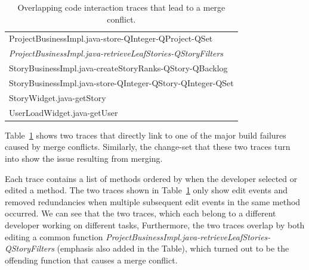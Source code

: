 \begin{table}[t!]
\begin{tabular}{l}
     ProjectBusinessImpl.java-store-QInteger-QProject-QSet        \\%
     \emph{ProjectBusinessImpl.java-retrieveLeafStories-QStoryFilters}                                 \\%
     StoryBusinessImpl.java-createStoryRanks-QStory-QBacklog                     \\%
     StoryBusinessImpl.java-store-QInteger-QStory-QInteger-QSet  \\%
     StoryWidget.java-getStory                                                       \\%
     UserLoadWidget.java-getUser                                                     \\%
      \bottomrule
\end{tabular}
\caption{Overlapping code interaction traces that lead to a merge conflict.}
\label{tab:overlappingtraces}
\end{table}

Table~\ref{tab:overlappingtraces} shows two traces that directly link to one of the major build failures caused by merge conflicts.
Similarly, the change-set that these two traces turn into show the issue resulting from merging.

Each trace contains a list of methods ordered by when the developer selected or edited a method.
The two traces shown in Table~\ref{tab:overlappingtraces} only show edit events and removed redundancies when multiple subsequent edit events in the same method occurred.
We can see that the two traces, which each belong to a different developer working on different tasks, 
Furthermore, the two traces overlap by both editing a common function \emph{ProjectBusinessImpl.java-retrieveLeafStories-QStoryFilters} (emphasis also added in the Table), which turned out to be the offending function that causes a merge conflict.

